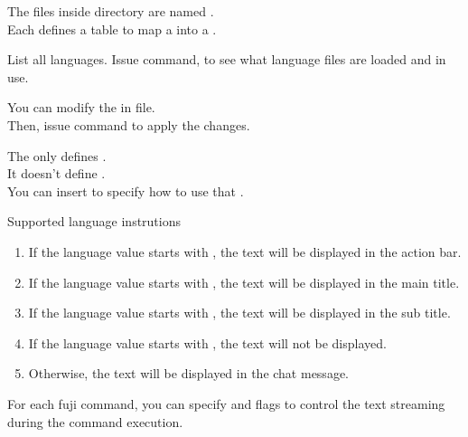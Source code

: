 \label{ch:language}

The files inside  directory are named . \\
Each  defines a table to map a  into a .

\begin{tips}{List all languages.}
    Issue  command, to see what language files are loaded and in use.
\end{tips}

You can modify the  in \mainconfig file. \\
Then, issue  command to apply the changes.

The  only defines . \\
It doesn't define . \\
You can insert  to specify how to use that . \\

\begin{note}{Supported language instrutions}
    \begin{enumerate}
        \item {If the language value starts with , the text will be displayed in the action bar.}
        \item {If the language value starts with , the text will be displayed in the main title.}
        \item {If the language value starts with , the text will be displayed in the sub title.}
        \item {If the language value starts with , the text will not be displayed.}
        \item {Otherwise, the text will be displayed in the chat message.}
    \end{enumerate}
\end{note}


For each fuji command, you can specify  and  flags to control the text streaming during the command execution.\\


